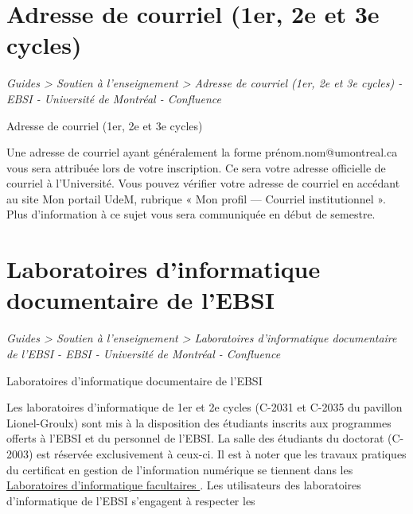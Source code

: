 \documentclass [12 pt]{article}
\begin{document}
    
    
        \newpage
        \section {
        Adresse de courriel (1er, 2e et 3e cycles)
        }
        
        
        
        \textit{
        Guides > Soutien à l'enseignement > Adresse de courriel (1er, 2e et 3e
            cycles) - EBSI - Université de Montréal - Confluence
        }
    
        Adresse de courriel (1er, 2e et 3e cycles)
        
            Une adresse de courriel ayant généralement la forme
                    prénom.nom@umontreal.ca vous sera attribuée lors de votre
                inscription. Ce sera votre adresse officielle de courriel à l'Université. Vous
                pouvez vérifier votre adresse de courriel en accédant au site Mon portail UdeM,
                rubrique « Mon profil — Courriel institutionnel ». Plus d'information à ce sujet
                vous sera communiquée en début de semestre.
        
    
    
        \newpage
        \section {
        Laboratoires d'informatique documentaire de l'EBSI
        }
        
        
        
        \textit{
        Guides > Soutien à l'enseignement > Laboratoires d'informatique
            documentaire de l'EBSI - EBSI - Université de Montréal - Confluence
        }
    
        Laboratoires d'informatique documentaire de l'EBSI
        
            Les laboratoires d'informatique de 1er et 2e cycles (C-2031 et
                C-2035 du pavillon Lionel-Groulx) sont mis à la disposition des étudiants inscrits
                aux programmes offerts à l'EBSI et du personnel de l'EBSI. La salle des étudiants du
                doctorat (C-2003) est réservée exclusivement à ceux-ci. Il est à noter que les
                travaux pratiques du certificat en gestion de l'information numérique se tiennent
                dans les 
        \href{
        /pages/viewpage.action?pageId=124095712
        } {
        Laboratoires
                    d'informatique facultaires
        }
    .
            Les utilisateurs des laboratoires d'informatique de l'EBSI s'engagent à respecter les
                        
\end{document}
